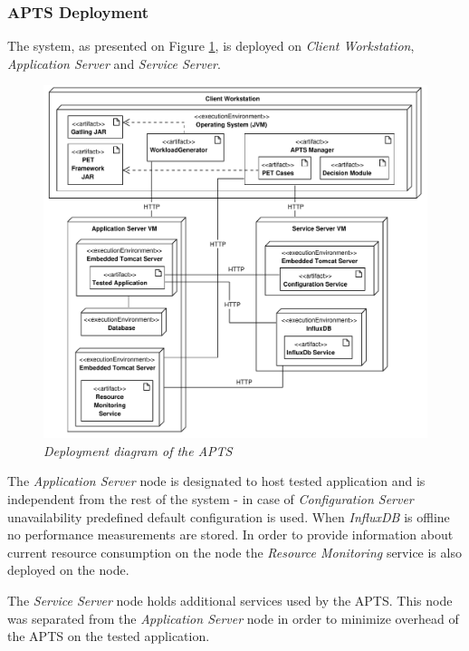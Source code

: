 \documentclass[10pt,a4paper]{article}
\begin{document}
\subsubsection{APTS Deployment} \label{section:aptsdeploy}

The system, as presented on Figure \ref{deploymentapts}, is deployed on \textit{Client Workstation}, \textit{Application Server} and \textit{Service Server}.

\begin{figure}[!htb]
\centering
\includegraphics[width=1\textwidth]{APTSDeploymentDiagram}
\caption{\textit{Deployment diagram of the APTS}}
\label{deploymentapts}
\end{figure}



The \textit{Application Server} node is designated to host tested application and is independent from the rest of the system - in case of \textit{Configuration Server} unavailability predefined default configuration is used. When \textit{InfluxDB} is offline no performance measurements are stored. In order to provide information about current resource consumption on the node the \textit{Resource Monitoring} service is also deployed on the node. 

The \textit{Service Server} node holds additional services used by the APTS. This node was separated from the \textit{Application Server} node in order to minimize overhead of the APTS on the tested application.
\end{document}
